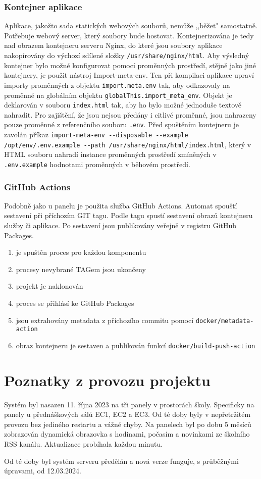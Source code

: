 \subsubsection{Kontejner aplikace}
Aplikace, jakožto sada statických webových souborů, nemůže ,,běžet" samostatně. Potřebuje webový server, který soubory bude hostovat. Kontejnerizována je tedy nad obrazem kontejneru serveru Nginx, do které jsou soubory aplikace nakopírovány do výchozí sdílené složky \lstinline|/usr/share/nginx/html|. Aby výsledný kontejner bylo možné konfigurovat pomocí proměnných prostředí, stějně jako jiné kontejnery, je použit nástroj Import-meta-env. Ten při kompilaci aplikace upraví importy proměnných z objektu \lstinline|import.meta.env| tak, aby odkazovaly na proměnné na globálním objektu \lstinline|globalThis.import_meta_env|. Objekt je deklarován v souboru \lstinline|index.html| tak, aby ho bylo možné jednoduše textově nahradit. Pro zajištění, že jsou nejsou předány i citlivé proměnné, jsou nahrazeny pouze proměnné z referenčního souboru \lstinline|.env|. Před spuštěním kontejneru je zavolán příkaz \lstinline|import-meta-env --disposable --example /opt/env/.env.example --path /usr/share/nginx/html/index.html|, který v HTML souboru nahradí instance proměnných prostředí zmíněných v \lstinline|.env.example| hodnotami proměnných v běhovém prostředí.

\subsubsection{GitHub Actions}
Podobně jako u panelu je použita služba GitHub Actions. Automat spouští sestavení při příchozím GIT tagu. Podle tagu spustí sestavení obrazů kontejneru služby či aplikace. Po sestavení jsou publikovány veřejně v registru GitHub Packages.

\begin{enumerate}
    \item je spuštěn proces pro každou komponentu
    \item procesy nevybrané TAGem jsou ukončeny
    \item projekt je naklonován
    \item proces se přihlásí ke GitHub Packages
    \item jsou extrahovány metadata z příchozího commitu pomocí \lstinline|docker/metadata-action|
    \item obraz kontejneru je sestaven a publikován funkcí \lstinline|docker/build-push-action|
\end{enumerate}

\section{Poznatky z provozu projektu}
Systém byl nasazen 11. října 2023 na tři panely v prostorách školy. Specificky na panely u přednáškových sálů EC1, EC2 a EC3. Od té doby byly v nepřetržitém provozu bez jediného restartu a vážné chyby. Na panelech byl po dobu 5 měsíců zobrazován dynamická obrazovka s hodinami, počasím a novinkami ze školního RSS kanálu. Aktualizace probíhala každou minutu.

Od té doby byl systém serveru předělán a nová verze funguje, s průběžnými úpravami, od 12.03.2024.

